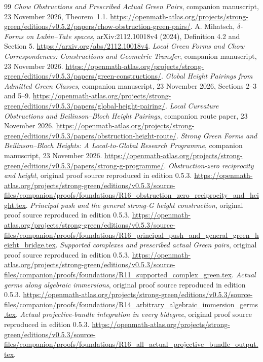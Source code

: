 \documentclass[11pt,a4paper]{article}
\theoremstyle{definition}
\numberwithin{equation}{section}
\begin{document}
\begin{thebibliography}{99}
 \emph{Chow Obstructions and Prescribed Actual Green Pairs}, companion manuscript, 23 November 2026, Theorem~1.1. \url{https://openmath-atlas.org/projects/strong-green/editions/v0.5.2/papers/chow-obstruction-green-pairs/}.
 A. Mihatsch, \emph{$\delta$-Forms on Lubin--Tate spaces}, arXiv:2112.10018v4 (2024), Definition 4.2 and Section 5. \url{https://arxiv.org/abs/2112.10018v4}.
 \emph{Local Green Forms and Chow Correspondences: Constructions and Geometric Transfer}, companion manuscript, 23 November 2026. \url{https://openmath-atlas.org/projects/strong-green/editions/v0.5.3/papers/green-constructions/}.
 \emph{Global Height Pairings from Admitted Green Classes}, companion manuscript, 23 November 2026, Sections 2--3 and 5--9. \url{https://openmath-atlas.org/projects/strong-green/editions/v0.5.3/papers/global-height-pairing/}.
 \emph{Local Curvature Obstructions and Beilinson--Bloch Height Pairings}, companion route paper, 23 November 2026. \url{https://openmath-atlas.org/projects/strong-green/editions/v0.5.3/papers/obstruction-height-route/}.
 \emph{Strong Green Forms and Beilinson--Bloch Heights: A Local-to-Global Research Programme}, companion manuscript, 23 November 2026. \url{https://openmath-atlas.org/projects/strong-green/editions/v0.5.3/papers/strong-g-programme/}.
 \emph{Obstruction-zero reciprocity and height}, original proof source reproduced in edition 0.5.3. \url{https://openmath-atlas.org/projects/strong-green/editions/v0.5.3/source-files/companion/proofs/foundations/R16_obstruction_zero_reciprocity_and_height.tex}.
 \emph{Principal push and the general strong-G height construction}, original proof source reproduced in edition 0.5.3. \url{https://openmath-atlas.org/projects/strong-green/editions/v0.5.3/source-files/companion/proofs/foundations/R16_principal_push_and_general_green_height_bridge.tex}.
 \emph{Supported complexes and prescribed actual Green pairs}, original proof source reproduced in edition 0.5.3. \url{https://openmath-atlas.org/projects/strong-green/editions/v0.5.3/source-files/companion/proofs/foundations/R11_supported_complex_green.tex}.
 \emph{Actual germs along algebraic immersions}, original proof source reproduced in edition 0.5.3. \url{https://openmath-atlas.org/projects/strong-green/editions/v0.5.3/source-files/companion/proofs/foundations/R14_arbitrary_algebraic_immersion_germs.tex}.
 \emph{Actual projective-bundle integration in every bidegree}, original proof source reproduced in edition 0.5.3. \url{https://openmath-atlas.org/projects/strong-green/editions/v0.5.3/source-files/companion/proofs/foundations/R16_all_actual_projective_bundle_output.tex}.

\end{thebibliography}
\end{document}
